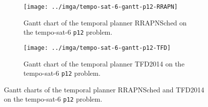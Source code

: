 \begin{figure}[tbp]
\centering
\begin{subfigure}{\textwidth}
\centering
\texttt{[image: ../imga/tempo-sat-6-gantt-p12-RRAPN]}
\caption{Gantt chart of the temporal planner RRAPNSched on the tempo-sat-6 \texttt{p12} problem.}
\label{fig:tempo-sat-6-gantt-12-rrapn}
\end{subfigure}


\begin{subfigure}{\textwidth}
\centering
\texttt{[image: ../imga/tempo-sat-6-gantt-p12-TFD]}
\caption{Gantt chart of the temporal planner TFD2014 on the tempo-sat-6 \texttt{p12} problem.}
\label{fig:tempo-sat-6-gantt-12-tfd}
\end{subfigure}
\caption{Gantt charts of the temporal planner RRAPNSched and TFD2014 on the tempo-sat-6 \texttt{p12} problem.}
\label{fig:tempo-sat-6-gantt}
\end{figure}

